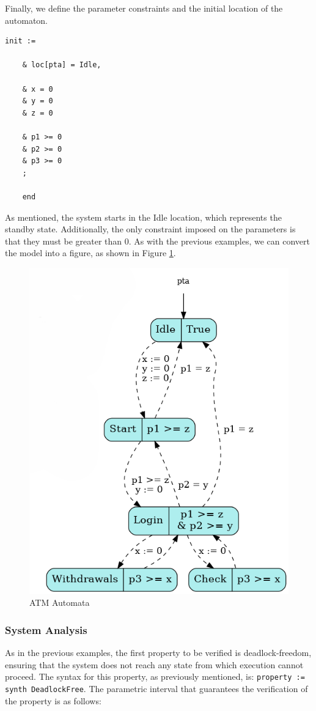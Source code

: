 Finally, we define the parameter constraints and the initial location of the automaton.

\begin{lstlisting}[language=UPPAAL]
    init := 

    & loc[pta] = Idle,
    
    & x = 0
    & y = 0
    & z = 0

    & p1 >= 0
    & p2 >= 0
    & p3 >= 0
    ;

    end
\end{lstlisting}


As mentioned, the system starts in the Idle location, which represents the standby state. Additionally, the only constraint imposed on the parameters is that they must be greater than 0. As with the previous examples, we can convert the model into a figure, as shown in Figure \ref{fig:ATM_output}.


\begin{figure} [H]
    \centering
    \includegraphics[width=0.6\linewidth]{images/fixed.png}
    \caption[ATM Automata]{ATM Automata}
    \label{fig:ATM_output}
\end{figure}

\subsubsection{System Analysis}

As in the previous examples, the first property to be verified is deadlock-freedom, ensuring that the system does not reach any state from which execution cannot proceed. The syntax for this property, as previously mentioned, is: \texttt{property := synth DeadlockFree}. The parametric interval that guarantees the verification of the property is as follows:

